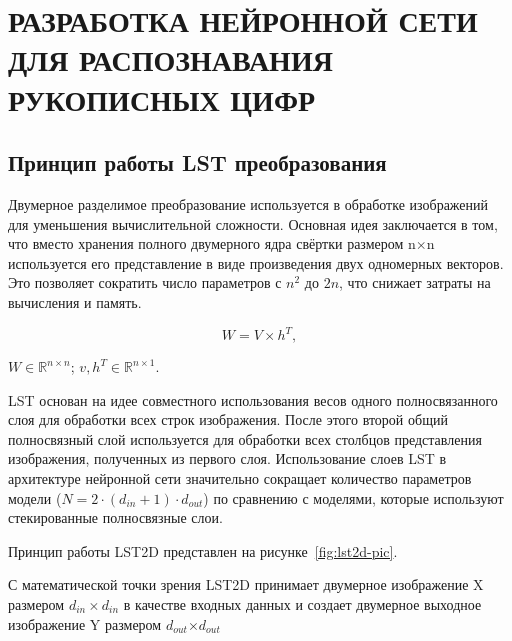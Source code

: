 \chapter[Разработка нейронной сети для распознавания рукописных цифр]
{РАЗРАБОТКА НЕЙРОННОЙ СЕТИ ДЛЯ РАСПОЗНАВАНИЯ РУКОПИСНЫХ ЦИФР}

\section{Принцип работы LST преобразования}\par
\hspace*{12.5 mm}Двумерное разделимое преобразование используется в обработке 
изображений для уменьшения вычислительной сложности. Основная идея заключается 
в том, что вместо хранения полного двумерного ядра свёртки размером 
n\(\times\)n используется его представление в виде произведения двух одномерных 
векторов. Это позволяет сократить число параметров с \(n^2\) до \(2n\), что 
снижает затраты на вычисления и память.

\begin{equation}
    W = V \times h^T,
\end{equation}

 \(W\in \mathbb{R}^{n\times n}\);
\(v, h^T\in \mathbb{R}^{n\times 1}\).

LST основан на идее совместного использования весов одного полносвязанного 
слоя для обработки всех строк изображения. После этого второй общий 
полносвязный слой используется для обработки всех столбцов представления 
изображения, полученных из первого слоя. Использование слоев LST в архитектуре 
нейронной сети значительно сокращает количество параметров модели ($ N = 2 \cdot (d_{in}+1) \cdot d_{out}$) по сравнению 
с моделями, которые используют стекированные полносвязные слои.

Принцип работы LST2D представлен на рисунке~\ref{fig:lst2d-pic}\cite{LST2D}. 


С математической точки зрения LST2D принимает двумерное изображение X размером 
\(d_{in}\times d_{in}\) в качестве входных данных и создает двумерное выходное 
изображение Y размером $d_{out}$\(\times\)$d_{out}$


